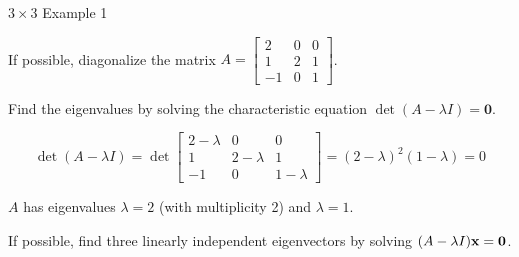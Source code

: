 \documentclass[xcolor=dvipsnames,aspectratio=169,t]{beamer}
\begin{document}
\begin{frame}{$3 \times 3$ Example 1}
  \smallskip

  If possible, diagonalize the matrix $A = \begin{bmatrix} 2 & 0 & 0 \\ 1 & 2 & 1 \\ -1 & 0 & 1 \end{bmatrix}$.
  \bigskip

  \bb
  \pause
  \ii \alert{Find the eigenvalues by solving the characteristic equation $\det (A - \lambda I) = \mathbf{0}$.}

  \[ \det (A - \lambda I) = \det \begin{bmatrix} 2 - \lambda &  0 & 0 \\ 1 & 2-\lambda & 1 \\ -1 & 0 & 1 - \lambda \end{bmatrix} = (2-\lambda)^2(1-\lambda) =0\]

  $A$ has eigenvalues $\lambda =2$ (with multiplicity 2) and $\lambda =1$.
  \bigskip

  \pause
  \ii \alert{If possible, find three linearly independent eigenvectors by solving $(A - \lambda I) \mathbf{x} = \mathbf{0}$.}
  \ee
\end{frame}
\end{document}
